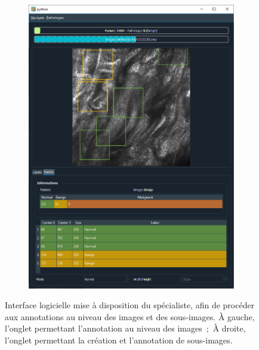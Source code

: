 \begin{figure}[H]
\begin{subfigure}{.45\textwidth}
      \includegraphics[width=\linewidth]{contents/ii_preamble_microscopy/resources/example_gui_annotation_2.png}
    \end{subfigure}
    \caption{Interface logicielle mise à disposition du spécialiste, afin de procéder aux annotations au niveau des images et des sous-images. À gauche, l'onglet permettant l'annotation au niveau des images~;~À droite, l'onglet permettant la création et l'annotation de sous-images.}
    \label{fig:example_gui_annotation}
\end{figure}

